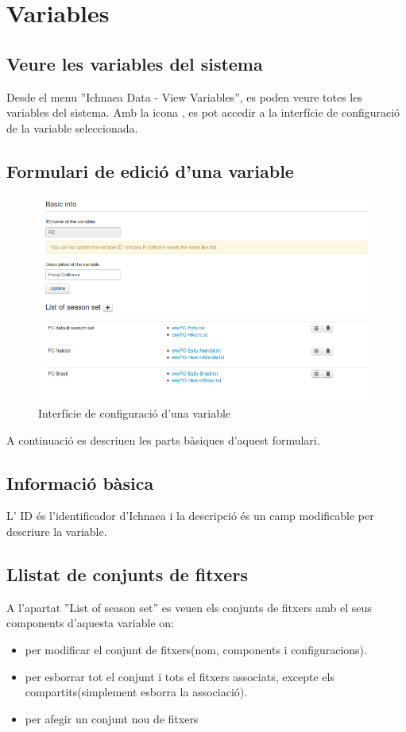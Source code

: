 \section{Variables}
\subsection{Veure les variables del sistema}
Desde el menu ''Ichnaea  Data - View Variables'', es poden veure totes les variables del sistema. Amb la icona \iconeyeopen, es pot accedir a la interfície de configuraci\'{o} de la variable seleccionada.

\subsection{Formulari de edici\'{o} d'una variable}
\begin{figure}[h!]
  \centering
  \includegraphics[scale=0.5]{img/userguide/variable_configuration.png}
  \caption{Interfície de configuraci\'{o} d'una variable}
  \label{fig:placement}
\end{figure}
A continuació es descriuen les parts bàsiques d'aquest formulari.

\subsection*{Informació bàsica}
L' ID \'{e}s l'identificador d'Ichnaea i la descripció \'{e}s un camp modificable per descriure la variable.
\subsection{Llistat de conjunts de fitxers}
A l'apartat ''List of season set'' es veuen els conjunts de fitxers amb el seus components d'aquesta variable on:
\begin{itemize}
\item \iconedit per modificar el conjunt de fitxers(nom, components i configuracions).
\item \icontrash per esborrar tot el conjunt i tots el fitxers associats, excepte els compartits(simplement esborra la associació).
\item \iconadd per afegir un conjunt nou de fitxers
\end{itemize}

